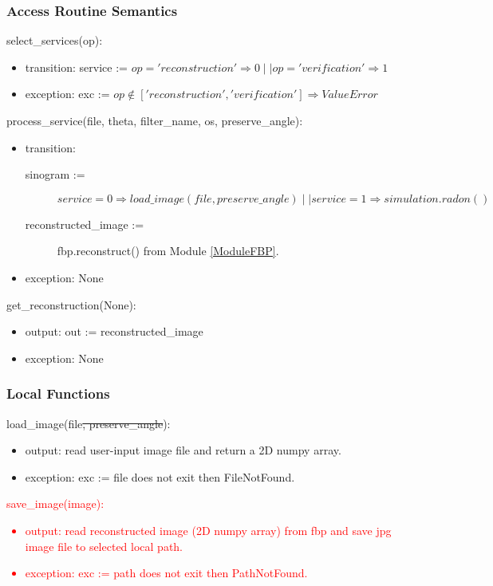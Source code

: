 \documentclass[12pt, titlepage]{article}
\newcommand{\add}{\textcolor{red}}
\begin{document}
\subsubsection{Access Routine Semantics}
\begin{cross}
\noindent
select\_services(op):
\begin{itemize}
\item transition:  service := \(op ='reconstruction' \Rightarrow  0 \mid\mid op = 'verification' \Rightarrow  1\)
\item exception: exc := \(op \notin ['reconstruction', 'verification'] \Rightarrow ValueError\)
\end{itemize}

\noindent
process\_service(file, theta, filter\_name, os, preserve\_angle):
\begin{itemize}
\item transition:
  \begin{description}
  \item[sinogram :=] \(service = 0 \Rightarrow load\_image(file, preserve\_angle) \mid\mid
    service = 1 \Rightarrow simulation.radon()\)
  \item[reconstructed\_image :=] fbp.reconstruct() from Module \ref{ModuleFBP}.
  \end{description}
\item exception: None
\end{itemize}

\noindent
get\_reconstruction(None):
\begin{itemize}
\item output: out := reconstructed\_image
\item exception: None
\end{itemize}
\end{cross}

\subsubsection{Local Functions}
\noindent
load\_image(file\st{, preserve\_angle}):
\begin{itemize}
\item output: read user-input image file and return a 2D numpy array.
\item exception: exc := file does not exit then FileNotFound.
\end{itemize}
\noindent
\add{
save\_image(image):
\begin{itemize}
\item output: read reconstructed image (2D numpy array) from fbp and save jpg image
  file to selected local path.
\item exception: exc := path does not exit then PathNotFound.
\end{itemize}
}
\newpage
\end{document}
